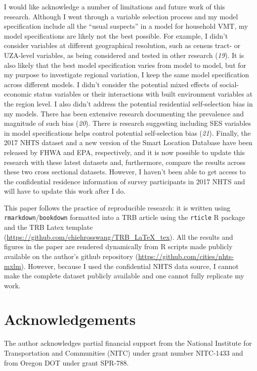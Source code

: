 \documentclass[numbered]{trbunofficial}
\begin{document}
I would like acknowledge a number of limitations and future work of this research. Although I went through a variable selection process and my model specification include all the ``usual suspects'' in a model for household VMT, my model specifications are likely not the best possible. For example, I didn't consider variables at different geographical resolution, such as census tract- or UZA-level variables, as being considered and tested in other research (\emph{19}). It is also likely that the best model specification varies from model to model, but for my purpose to investigate regional variation, I keep the same model specification across different models. I didn't consider the potential mixed effects of social-economic status variables or their interactions with built environment variables at the region level. I also didn't address the potential residential self-selection bias in my models. There has been extensive research documenting the prevalence and magnitude of such bias (\emph{20}). There is research suggesting including SES variables in model specifications helps control potential self-selection bias (\emph{21}). Finally, the 2017 NHTS dataset and a new version of the Smart Location Database have been released by FHWA and EPA, respectively, and it is now possible to update this research with these latest datasets and, furthermore, compare the results across these two cross sectional datasets. However, I haven't been able to get access to the confidential residence information of survey participants in 2017 NHTS and will have to update this work after I do.

This paper follows the practice of reproducible research: it is written using \texttt{rmarkdown}/\texttt{bookdown} formatted into a TRB article using the \texttt{rticle} R package and the TRB Latex template (\url{https://github.com/chiehrosswang/TRB_LaTeX_tex}). All the results and figures in the paper are rendered dynamically from R scripts made publicly available on the author's github repository (\url{https://github.com/cities/nhts-mxlm}). However, because I used the confidential NHTS data source, I cannot make the complete dataset publicly available and one cannot fully replicate my work.

\hypertarget{acknowledgements}{%
\section{Acknowledgements}\label{acknowledgements}}

The author acknowledges partial financial support from the National Institute for Transportation and Communities (NITC) under grant number NITC-1433 and from Oregon DOT under grant SPR-788.
\end{document}
